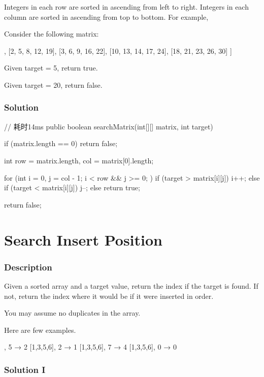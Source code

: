 Integers in each row are sorted in ascending from left to right.
Integers in each column are sorted in ascending from top to bottom.
For example,

Consider the following matrix:
\begin{Code}
[
  [1,   4,  7, 11, 15],
  [2,   5,  8, 12, 19],
  [3,   6,  9, 16, 22],
  [10, 13, 14, 17, 24],
  [18, 21, 23, 26, 30]
]
\end{Code}

Given target = 5, return true.

Given target = 20, return false.

\subsubsection{Solution}

\begin{Code}
// 耗时14ms
public boolean searchMatrix(int[][] matrix, int target) {
    if (matrix.length == 0) {
        return false;
    }

    int row = matrix.length, col = matrix[0].length;

    for (int i = 0, j = col - 1; i < row && j >= 0; ) {
        if (target > matrix[i][j]) {
            i++;
        } else if (target < matrix[i][j]) {
            j--;
        } else {
            return true;
        }
    }

    return false;
}
\end{Code}

\newpage

\section{Search Insert Position} %

\subsubsection{Description}
Given a sorted array and a target value, return the index if the target is found. If not, return the index where it would be if it were inserted in order.

You may assume no duplicates in the array.

Here are few examples.
\begin{Code}
[1,3,5,6], 5 → 2
[1,3,5,6], 2 → 1
[1,3,5,6], 7 → 4
[1,3,5,6], 0 → 0
\end{Code}

\subsubsection{Solution I}

